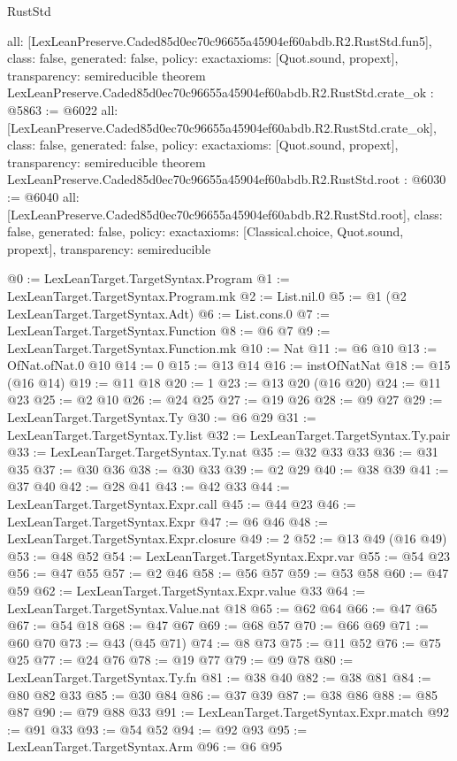 \begin{lexlean}{RustStd}
\begin{coremodule}
{  all: [LexLeanPreserve.Caded85d0ec70c96655a45904ef60abdb.R2.RustStd.fun5],
  class: false,
  generated: false,
  policy: exact{axioms: [Quot.sound, propext]},
  transparency: semireducible
}
theorem LexLeanPreserve.Caded85d0ec70c96655a45904ef60abdb.R2.RustStd.crate_ok : @5863 := @6022 {
  all: [LexLeanPreserve.Caded85d0ec70c96655a45904ef60abdb.R2.RustStd.crate_ok],
  class: false,
  generated: false,
  policy: exact{axioms: [Quot.sound, propext]},
  transparency: semireducible
}
theorem LexLeanPreserve.Caded85d0ec70c96655a45904ef60abdb.R2.RustStd.root : @6030 := @6040 {
  all: [LexLeanPreserve.Caded85d0ec70c96655a45904ef60abdb.R2.RustStd.root],
  class: false,
  generated: false,
  policy: exact{axioms: [Classical.choice, Quot.sound, propext]},
  transparency: semireducible
}

@0 := LexLeanTarget.TargetSyntax.Program
@1 := LexLeanTarget.TargetSyntax.Program.mk
@2 := List.nil.{0}
@5 := @1 (@2 LexLeanTarget.TargetSyntax.Adt)
@6 := List.cons.{0}
@7 := LexLeanTarget.TargetSyntax.Function
@8 := @6 @7
@9 := LexLeanTarget.TargetSyntax.Function.mk
@10 := Nat
@11 := @6 @10
@13 := OfNat.ofNat.{0} @10
@14 := 0
@15 := @13 @14
@16 := instOfNatNat
@18 := @15 (@16 @14)
@19 := @11 @18
@20 := 1
@23 := @13 @20 (@16 @20)
@24 := @11 @23
@25 := @2 @10
@26 := @24 @25
@27 := @19 @26
@28 := @9 @27
@29 := LexLeanTarget.TargetSyntax.Ty
@30 := @6 @29
@31 := LexLeanTarget.TargetSyntax.Ty.list
@32 := LexLeanTarget.TargetSyntax.Ty.pair
@33 := LexLeanTarget.TargetSyntax.Ty.nat
@35 := @32 @33 @33
@36 := @31 @35
@37 := @30 @36
@38 := @30 @33
@39 := @2 @29
@40 := @38 @39
@41 := @37 @40
@42 := @28 @41
@43 := @42 @33
@44 := LexLeanTarget.TargetSyntax.Expr.call
@45 := @44 @23
@46 := LexLeanTarget.TargetSyntax.Expr
@47 := @6 @46
@48 := LexLeanTarget.TargetSyntax.Expr.closure
@49 := 2
@52 := @13 @49 (@16 @49)
@53 := @48 @52
@54 := LexLeanTarget.TargetSyntax.Expr.var
@55 := @54 @23
@56 := @47 @55
@57 := @2 @46
@58 := @56 @57
@59 := @53 @58
@60 := @47 @59
@62 := LexLeanTarget.TargetSyntax.Expr.value @33
@64 := LexLeanTarget.TargetSyntax.Value.nat @18
@65 := @62 @64
@66 := @47 @65
@67 := @54 @18
@68 := @47 @67
@69 := @68 @57
@70 := @66 @69
@71 := @60 @70
@73 := @43 (@45 @71)
@74 := @8 @73
@75 := @11 @52
@76 := @75 @25
@77 := @24 @76
@78 := @19 @77
@79 := @9 @78
@80 := LexLeanTarget.TargetSyntax.Ty.fn
@81 := @38 @40
@82 := @38 @81
@84 := @80 @82 @33
@85 := @30 @84
@86 := @37 @39
@87 := @38 @86
@88 := @85 @87
@90 := @79 @88 @33
@91 := LexLeanTarget.TargetSyntax.Expr.match
@92 := @91 @33
@93 := @54 @52
@94 := @92 @93
@95 := LexLeanTarget.TargetSyntax.Arm
@96 := @6 @95

\end{coremodule}
\end{lexlean}
